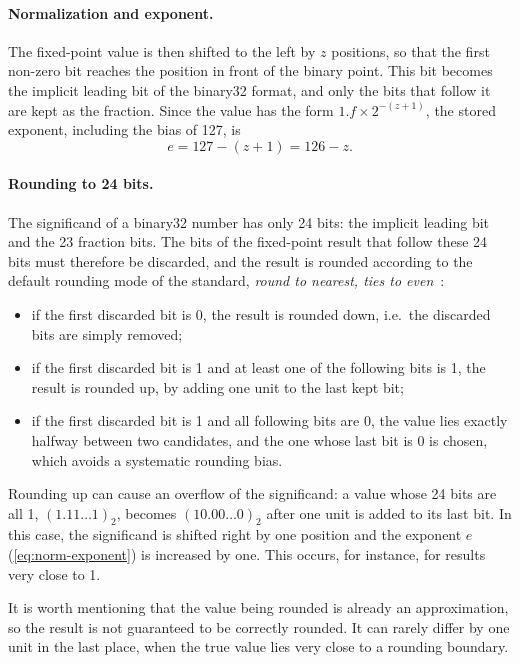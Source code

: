 \paragraph{Normalization and exponent.}
The fixed-point value is then shifted to the left by $z$ positions, so that
the first non-zero bit reaches the position in front of the binary point.
This bit becomes the implicit leading bit of the binary32 format, and only
the bits that follow it are kept as the fraction. Since the value has the
form $1.f \times 2^{-(z+1)}$, the stored exponent, including the bias of 127,
is
\begin{equation}
  e = 127 - (z + 1) = 126 - z.
  \label{eq:norm-exponent}
\end{equation}

\paragraph{Rounding to 24 bits.}
The significand of a binary32 number has only 24 bits: the implicit leading
bit and the 23 fraction bits. The bits of the fixed-point result that follow
these 24 bits must therefore be discarded, and the result is rounded according
to the default rounding mode of the standard, \emph{round to nearest, ties to
even}~\cite{ieee754}:
\begin{itemize}
  \item if the first discarded bit is 0, the result is rounded down, i.e.\ the
    discarded bits are simply removed;
  \item if the first discarded bit is 1 and at least one of the following bits
    is 1, the result is rounded up, by adding one unit to the last kept
    bit;
  \item if the first discarded bit is 1 and all following bits are 0, the
    value lies exactly halfway between two candidates, and the one whose
    last bit is 0 is chosen, which avoids a systematic rounding bias.
\end{itemize}
Rounding up can cause an overflow of the significand: a value whose 24 bits
are all 1, $(1.11\ldots1)_{2}$, becomes $(10.00\ldots0)_{2}$ after one unit
is added to its last bit. In this case, the significand is shifted right by
one position and the exponent $e$ (\cref{eq:norm-exponent}) is increased by
one. This occurs, for instance, for results very close to 1.

It is worth mentioning that the value being rounded is already an approximation,
so the result is not guaranteed to be correctly rounded. It can rarely differ
by one unit in the last place, when the true value lies very close to a rounding boundary.

